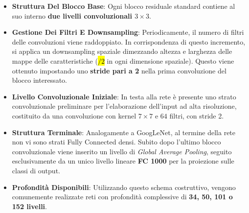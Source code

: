 ﻿\documentclass[11pt, a4paper]{article}
\begin{document}
\begin{itemize}
    \item \textbf{Struttura Del Blocco Base}: Ogni blocco residuale standard contiene al suo interno \textbf{due livelli convoluzionali $3\times3$}.


    \item \textbf{Gestione Dei Filtri E Downsampling}: Periodicamente, il numero di filtri delle convoluzioni viene raddoppiato. In corrispondenza di questo incremento, si applica un downsampling spaziale dimezzando altezza e larghezza delle mappe delle caratteristiche (\hl{$/2$} in ogni dimensione spaziale). Questo viene ottenuto impostando uno \textbf{stride pari a 2} nella prima convoluzione del blocco interessato.


    \item \textbf{Livello Convoluzionale Iniziale}: In testa alla rete è presente uno strato convoluzionale preliminare per l'elaborazione dell'input ad alta risoluzione, costituito da una convoluzione con kernel $7\times7$ e $64$ filtri, con stride 2.


    \item \textbf{Struttura Terminale}: Analogamente a GoogLeNet, al termine della rete non vi sono strati Fully Connected densi. Subito dopo l'ultimo blocco convoluzionale viene inserito un livello di \emph{Global Average Pooling}, seguito esclusivamente da un unico livello lineare \textbf{FC 1000} per la proiezione sulle classi di output.


    \item \textbf{Profondità Disponibili}: Utilizzando questo schema costruttivo, vengono comunemente realizzate reti con profondità complessive di \textbf{34, 50, 101 o 152 livelli}.

\end{itemize}
\end{document}
